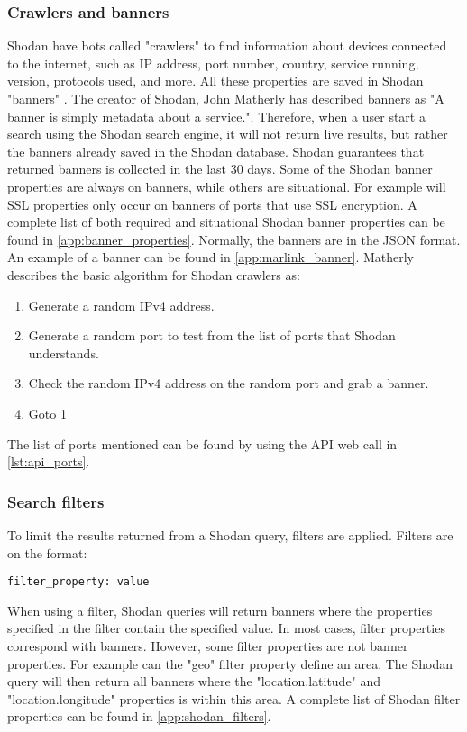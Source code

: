 \subsubsection{Crawlers and banners}
Shodan have bots called "crawlers" to find information about devices connected to the internet, such as IP address, port number, country, service running, version, protocols used, and more. 
All these properties are saved in Shodan "banners" . The creator of Shodan, John Matherly has described banners as "A banner is simply metadata about a service.". \cite{banner} 
Therefore, when a user start a search using the Shodan search engine, it will not return live results, but rather the banners already saved in the Shodan database. Shodan guarantees that returned banners is collected in the last 30 days.\cite{matherly_guide_to_shodan}
Some of the Shodan banner properties are always on banners, while others are situational. For example will SSL properties only occur on banners of ports that use SSL encryption. A complete list of both required and situational Shodan banner properties can be found in \cref{app:banner_properties}.
Normally, the banners are in the JSON format. An example of a banner can be found in \cref{app:marlink_banner}.
Matherly\cite{matherly_guide_to_shodan} describes the basic algorithm for Shodan crawlers as:
\begin{enumerate}
\setlength\itemsep{0em}
	\item Generate a random IPv4 address. 
	\item Generate a random port to test from the list of ports that Shodan understands.
	\item Check the random IPv4 address on the random port and grab a banner.
	\item Goto 1
\end{enumerate}
The list of ports mentioned can be found by using the API web call in \cref{lst:api_ports}.


\subsubsection{Search filters} \label{sec:filters}
To limit the results returned from a Shodan query, filters are applied. Filters are on the format:
\begin{lstlisting}
filter_property: value
\end{lstlisting}
When using a filter, Shodan queries will return banners where the properties specified in the filter contain the specified value. In most cases, filter properties correspond with banners. However, some filter properties are not banner properties. For example can the "geo" filter property define an area. The Shodan query will then return all banners where the "location.latitude" and "location.longitude" properties is within this area. A complete list of Shodan filter properties can be found in \cref{app:shodan_filters}.

